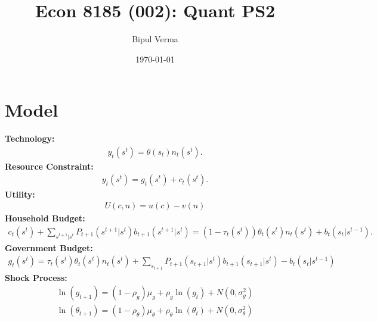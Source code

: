 \documentclass[12pt]{article}
\begin{document}

\title{Econ 8185 (002): Quant PS2}
\author{Bipul Verma}
\date{\today}
\maketitle


\vspace{8cm}



\newpage

\section*{Model}

\textbf{Technology:}\\
\begin{align*}
y_t(s^t) = \theta(s_t) n_t(s^t).
\end{align*}
\textbf{Resource Constraint:}\\
\begin{align*}
y_t(s^t) = g_t(s^t) + c_t(s^t).
\end{align*}
\textbf{Utility:}\\
\begin{align*}
U(c, n) = u(c) - v(n)
\end{align*}
\textbf{Household Budget:}\\
\begin{align*}
c_t(s^t) + \sum_{s^{t+1}|s^t} P_{t+1}(s^{t+1}|s^t)b_{t+1}(s^{t+1}|s^t) = (1-\tau_t(s^t))\theta_t(s^t)n_t(s^t) + b_t(s_t|s^{t-1}).
\end{align*}
\textbf{Government Budget:}\\
\begin{align*}
g_t(s^t) =   \tau_t(s^t)\theta_t(s^t)  n_t(s^t) + \sum_{s_{t+1}} P_{t+1}(s_{t+1} | s^t) b_{t+1}(s_{t+1} | s^t) -
b_t(s_t | s^{t-1})
\end{align*}
\textbf{Shock Process:}\\
\begin{align*}
\ln(g_{t+1}) = (1-\rho_g)\mu_g + \rho_g \ln( g_t) + N(0, \sigma_g^2)\\
\ln(\theta_{t+1}) = (1-\rho_\theta)\mu_\theta + \rho_\theta \ln(\theta_t) + N(0, \sigma_\theta^2)
\end{align*}
\end{document}
